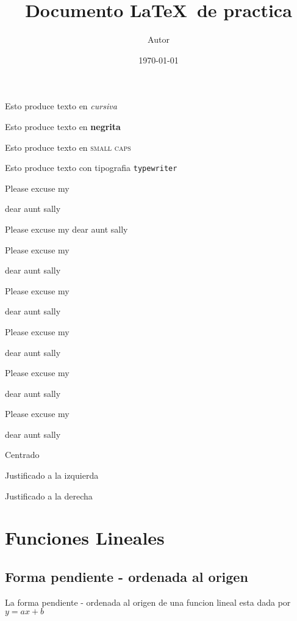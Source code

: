 \documentclass[11pt]{article}
\begin{document}
\tableofcontents
\title{Documento \LaTeX \ de practica}
\author{Autor}
\date{\today}

\maketitle

Esto produce texto en \textit{cursiva}

Esto produce texto en \textbf{negrita}

Esto produce texto en \textsc{small caps}

Esto produce texto con tipografia \texttt{typewriter}

Please excuse my \begin{tiny}dear aunt sally
\end{tiny}

Please excuse my dear aunt sally

Please excuse my \begin{large}dear aunt sally
\end{large}

Please excuse my \begin{Large}dear aunt sally
\end{Large}

Please excuse my \begin{LARGE}dear aunt sally
\end{LARGE}

Please excuse my \begin{huge}dear aunt sally
\end{huge}

Please excuse my \begin{Huge}dear aunt sally
\end{Huge}

\begin{center}
Centrado
\end{center}

\begin{flushleft}
Justificado a la izquierda
\end{flushleft}

\begin{flushright}
Justificado a la derecha
\end{flushright}

\section{Funciones Lineales}
	\subsection{Forma pendiente - ordenada al origen}
	La forma pendiente - ordenada al origen de una funcion lineal esta dada por $y = ax + b$
\end{document}
